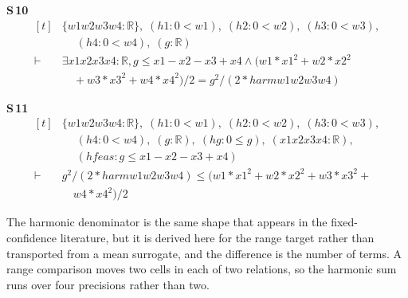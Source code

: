 \noindent\textbf{S\,10}\quad{}
{\footnotesize\[ \begin{aligned}[t]
&\{ \mathit{w1} \mathit{w2} \mathit{w3} \mathit{w4} : \mathbb{R} \},\; (\mathit{h1} : 0 < \mathit{w1}),\; (\mathit{h2} : 0 < \mathit{w2}),\; (\mathit{h3} : 0 < \mathit{w3}),\\
&\quad \; (\mathit{h4} : 0 < \mathit{w4}),\; (\mathit{g} : \mathbb{R} )\\
\vdash\;&\exists \mathit{x1} \mathit{x2} \mathit{x3} \mathit{x4} : \mathbb{R} , \mathit{g} \leq \mathit{x1} - \mathit{x2} - \mathit{x3} + \mathit{x4} \wedge (\mathit{w1}*\mathit{x1}^{2} + \mathit{w2}*\mathit{x2}^{2}\\
&\quad + \mathit{w3}*\mathit{x3}^{2} + \mathit{w4}*\mathit{x4}^{2}) / 2 = \mathit{g} ^{2} / (2 * \mathit{harm} \mathit{w1} \mathit{w2} \mathit{w3} \mathit{w4})
\end{aligned} \]}

\noindent\textbf{S\,11}\quad{}
{\footnotesize\[ \begin{aligned}[t]
&\{ \mathit{w1} \mathit{w2} \mathit{w3} \mathit{w4} : \mathbb{R} \},\; (\mathit{h1} : 0 < \mathit{w1}),\; (\mathit{h2} : 0 < \mathit{w2}),\; (\mathit{h3} : 0 < \mathit{w3}),\\
&\quad \; (\mathit{h4} : 0 < \mathit{w4}),\; (\mathit{g} : \mathbb{R} ),\; (\mathit{hg} : 0 \leq \mathit{g}),\; (\mathit{x1} \mathit{x2} \mathit{x3} \mathit{x4} : \mathbb{R} ),\\
&\quad \; (\mathit{hfeas} : \mathit{g} \leq \mathit{x1} - \mathit{x2} - \mathit{x3} + \mathit{x4})\\
\vdash\;&\mathit{g} ^{2} / (2 * \mathit{harm} \mathit{w1} \mathit{w2} \mathit{w3} \mathit{w4}) \leq (\mathit{w1}*\mathit{x1}^{2} + \mathit{w2}*\mathit{x2}^{2} + \mathit{w3}*\mathit{x3}^{2} +\\
&\quad \mathit{w4}*\mathit{x4}^{2}) / 2
\end{aligned} \]}


The harmonic denominator is the same shape that appears in the fixed-confidence literature,
but it is derived here for the range target rather than transported from a mean surrogate,
and the difference is the number of terms. A range comparison moves two cells in each of two
relations, so the harmonic sum runs over four precisions rather than two.

